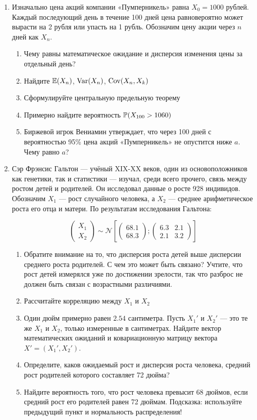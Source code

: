 \documentclass[12pt, a4paper]{article}\usepackage[]{graphicx}\usepackage[]{color}
\newcommand{\cN}{\mathcal{N}}
\begin{document}
\begin{enumerate}
\item Изначально цена акций компании «Пумперникель» равна $X_0=1000$ рублей. Каждый последующий день в течение 100 дней цена равновероятно может вырасти на 2 рубля или упасть на 1 рубль. Обозначим цену акции через $n$ дней как $X_n$.
\begin{enumerate}
\item Чему равны математическое ожидание и дисперсия изменения цены за отдельный день?
\item Найдите $\E(X_n)$, $\Var(X_n)$, $\Cov(X_n, X_k)$
\item Сформулируйте центральную предельную теорему
\item Примерно найдите вероятность $\P(X_{100}>1060)$
\item Биржевой игрок Вениамин утверждает, что через 100 дней с вероятностью 95\% цена акций «Пумперникель» не опустится ниже $a$. Чему равно $a$?
\end{enumerate}
\item  Сэр Фрэнсис Гальтон —  учёный XIX-XX веков, один из основоположников как
генетики, так и статистики — изучал, среди всего прочего, связь между ростом детей и родителей.  Он исследовал данные о росте 928 индивидов. Обозначим $X_1$ — рост случайного человека, а $X_2$ — среднее арифметическое роста его отца и матери. По результатам исследования Гальтона:


\[
\begin{pmatrix}
X_1 \\
X_2
\end{pmatrix}
\sim
\cN\left[
\begin{pmatrix}
68.1 \\
68.3
\end{pmatrix};
\begin{pmatrix}
6.3 & 2.1 \\
2.1 & 3.2
\end{pmatrix}
\right]
\]

\begin{enumerate}
\item Обратите внимание на то, что дисперсия роста детей выше дисперсии среднего роста
родителей. С чем это
может быть связано? Учтите, что рост детей измерялся уже по достижении
зрелости, так что разброс не должен быть связан с возрастными различиями.
\item Рассчитайте корреляцию между $X_1$ и $X_2$
\item Один дюйм примерно равен $2.54$ сантиметра. Пусть $X_1'$ и $X_2'$ — это те же $X_1$ и $X_2$, только измеренные в сантиметрах. Найдите вектор математических ожиданий и ковариационную матрицу вектора $X'=(X_1', X_2')$.
\item Определите, каков ожидаемый рост и дисперсия роста человека, средний рост родителей которого составляет 72 дюйма?
\item Найдите вероятность того, что рост человека превысит 68 дюймов, если средний рост его родителей равен 72 дюймам. Подсказка: используйте предыдущий пункт и нормальность распределения!
\end{enumerate}


\end{enumerate}
\end{document}
